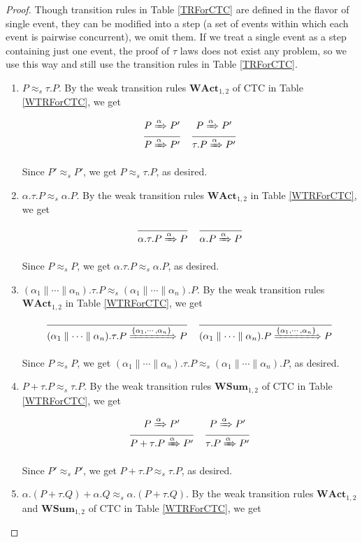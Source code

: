 \begin{proof}
Though transition rules in Table \ref{TRForCTC} are defined in the flavor of single event, they can be modified into a step (a set of events within which each event is pairwise concurrent), we omit them. If we treat a single event as a step containing just one event, the proof of $\tau$ laws does not exist any problem, so we use this way and still use the transition rules in Table \ref{TRForCTC}.

\begin{enumerate}
  \item $P\approx_s \tau.P$. By the weak transition rules $\textbf{WAct}_{1,2}$ of CTC in Table \ref{WTRForCTC}, we get

  $$\frac{P\xRightarrow{\alpha}P'}{P\xRightarrow{\alpha}P'}
  \quad \frac{P\xRightarrow{\alpha}P'}{\tau.P\xRightarrow{\alpha} P'}$$

  Since $P'\approx_s P'$, we get $P\approx_s \tau.P$, as desired.
  \item $\alpha.\tau.P\approx_s \alpha.P$. By the weak transition rules $\textbf{WAct}_{1,2}$ in Table \ref{WTRForCTC}, we get

  $$\frac{}{\alpha.\tau.P\xRightarrow{\alpha}P}
  \quad \frac{}{\alpha.P\xRightarrow{\alpha}P}$$

  Since $P\approx_s P$, we get $\alpha.\tau.P\approx_s \alpha.P$, as desired.
  \item $(\alpha_1\parallel\cdots\parallel\alpha_n).\tau.P\approx_s (\alpha_1\parallel\cdots\parallel\alpha_n).P$. By the weak transition rules $\textbf{WAct}_{1,2}$ in Table \ref{WTRForCTC}, we get

  $$\frac{}{(\alpha_1\parallel\cdots\parallel\alpha_n).\tau.P\xRightarrow{\{\alpha_1,\cdots,\alpha_n\}}P}
  \quad \frac{}{(\alpha_1\parallel\cdots\parallel\alpha_n).P\xRightarrow{\{\alpha_1,\cdots,\alpha_n\}}P}$$

  Since $P\approx_s P$, we get $(\alpha_1\parallel\cdots\parallel\alpha_n).\tau.P\approx_s (\alpha_1\parallel\cdots\parallel\alpha_n).P$, as desired.
  \item $P+\tau.P\approx_s \tau.P$. By the weak transition rules $\textbf{WSum}_{1,2}$ of CTC in Table \ref{WTRForCTC}, we get

  $$\frac{P\xRightarrow{\alpha}P'}{P+\tau.P\xRightarrow{\alpha}P'}
  \quad \frac{P\xRightarrow{\alpha}P'}{\tau.P\xRightarrow{\alpha} P'}$$

  Since $P'\approx_s P'$, we get $P+\tau.P\approx_s \tau.P$, as desired.
  \item $\alpha.(P+\tau.Q)+\alpha.Q\approx_s\alpha.(P+\tau.Q)$. By the weak transition rules $\textbf{WAct}_{1,2}$ and $\textbf{WSum}_{1,2}$ of CTC in Table \ref{WTRForCTC}, we get


\end{enumerate}
\end{proof}

